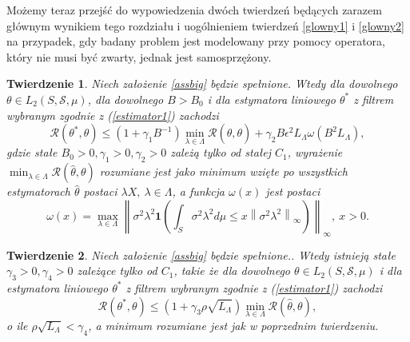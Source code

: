 \documentclass{article}
\newtheorem{tw}{Twierdzenie}
\newcommand{\norm}[1]{\left\lVert#1\right\rVert}
\begin{document}
Możemy teraz przejść do wypowiedzenia dwóch twierdzeń będących zarazem głównym wynikiem tego rozdziału i uogólnieniem twierdzeń \ref{glowny1} i \ref{glowny2} na przypadek, gdy badany problem jest modelowany przy pomocy operatora, który nie musi być zwarty, jednak jest samosprzężony.


\begin{tw}\label{glowny3}
Niech założenie \ref{assbig} będzie spełnione. Wtedy dla dowolnego $\theta\in L_2(S,\mathcal{S},\mu)$, dla dowolnego $B>B_0$ i dla estymatora liniowego $\theta^*$ z filtrem wybranym zgodnie z (\ref{estimator1}) zachodzi
\begin{displaymath}
\mathcal{R}(\theta^*,\theta)\leq (1+\gamma_1B^{-1})\min_{\lambda\in \Lambda}\mathcal{R}(\hat{\theta},\theta)+\gamma_2B\epsilon^2L_{\Lambda}\omega(B^2L_{\Lambda}),
\end{displaymath}
gdzie stałe $B_0>0,\gamma_1>0,\gamma_2>0$ zależą tylko od stałej $C_1$, wyrażenie $\min_{\lambda\in \Lambda}\mathcal{R}(\hat{\theta},\theta)$ rozumiane jest jako minimum wzięte po wszystkich estymatorach $\hat{\theta}$ postaci $\lambda X,\ \lambda\in \Lambda$, a funkcja $\omega(x)$ jest postaci
\begin{displaymath}
\omega(x)=\max_{\lambda\in \Lambda}\norm{\sigma^2\lambda^2\pmb{1}\left(\int_S\sigma^2\lambda^2d\mu\leq x \norm{\sigma^2\lambda^2}_{\infty}\right)}_{\infty},\ x>0.
\end{displaymath}
\end{tw}
\begin{tw}\label{glowny4}
Niech założenie \ref{assbig} będzie spełnione.. Wtedy istnieją stałe $\gamma_3>0,\gamma_4>0$ zależące tylko od $C_1$, takie że dla dowolnego $\theta\in L_2(S,\mathcal{S},\mu)$ i dla estymatora liniowego $\theta^*$ z filtrem wybranym zgodnie z (\ref{estimator1}) zachodzi
\begin{displaymath}
\mathcal{R}(\theta^*,\theta)\leq (1+\gamma_3\rho\sqrt{L_{\Lambda}})\min_{\lambda\in \Lambda}\mathcal{R}(\hat{\theta},\theta),
\end{displaymath}
o ile $\rho\sqrt{L_{\Lambda}}<\gamma_4$, a minimum rozumiane jest jak w poprzednim twierdzeniu.
\end{tw}
\end{document}
